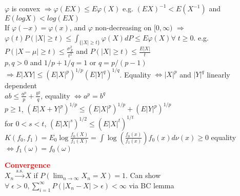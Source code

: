 \documentclass{article}
\renewcommand{\section}[1]{\textcolor{red}{\textbf{#1}}}
\renewcommand{\subsection}[1]{\text{\hl{[#1]}}}
\newcommand{\compact}{\\}
\begin{document}
\subsection{Jensen}
$\varphi$ is convex $\Rightarrow \varphi(EX) \leq E\varphi(X) $
e.g.  $(EX)^{-1} < E(X^{-1})$ and $E(logX)<log(EX)$
\compact
\subsection{Chebyshev}
If $\varphi(-x) = \varphi(x)$, and $\varphi$ non-decreasing on $[0, \infty)$
$\Rightarrow$
$ \varphi(t) P(|X|\geq t) \leq \int_{\{|X|\geq t\}} \varphi(X) dP \leq E\varphi(X) \forall \; t \geq 0$.
e.g.
$ P(|X-\mu| \geq t) \leq \frac{\sigma_X^2}{t^2}$ and $ P(|X|\geq t) \leq \frac{E|X|}{t} $
\compact
\subsection{Hölder}
$p, q > 0$ and $1/p + 1/q = 1$ or $q = p / (p-1)$
$\Rightarrow E|XY| \leq (E|X|^p)^{1/p}(E|Y|^q)^{1/q} $.
Equality $\Leftrightarrow |X|^p$ and $|Y|^q$ linearly dependent
\compact
\subsection{Young}
$ ab \leq \frac{a^p}{p} + \frac{b^q}{q} $, equality $\Leftrightarrow a^p = b^q$
\compact
\subsection{Minkowski} $p \geq 1$,
$
    (E|X+Y|^p)^{1/p} \leq (E|X|^p)^{1/p} + (E|Y|^p)^{1/p}
$
\compact
\subsection{Lyapunov} for $0 < s < t$,
$ (E|X|^s)^{1/2} \leq (E|X|^t)^{1/t} $
\compact
\subsection{KL}
$K(f_0, f_1) = E_0 \log \frac{f_0(X)}{f_1(X)} = \int \log \left(\frac{f_0(x)}{f_1(x)}\right) f_0(x)d\nu(x) \geq 0$
equality $\Leftrightarrow f_1(\omega)=f_0(\omega)$

\section{Convergence}
\compact
\subsection{a.s} $X_n\xrightarrow{\text{a.s.}}X$ if
$ P\left(\lim_{n\rightarrow\infty} X_n = X\right) = 1 $.
Can show $\forall \;\epsilon > 0, \sum_{i=1}^\infty P(|X_n - X| > \epsilon) < \infty$ via BC lemma
\compact
\end{document}
